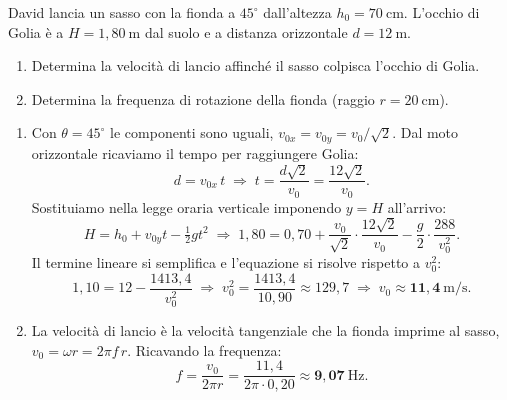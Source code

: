 \begin{question}[ID=1.7, subtitle={David e Golia: velocità e frequenza della fionda}, tags={moto parabolico, moto circolare, traiettoria}, difficulty=difficile]
David lancia un sasso con la fionda a $45^\circ$ dall'altezza $h_0 = 70\ \mathrm{cm}$. L'occhio di Golia è a $H = 1{,}80\ \mathrm{m}$ dal suolo e a distanza orizzontale $d = 12\ \mathrm{m}$.
\begin{enumerate}[parsep=0pt,itemsep=2pt]
    \item Determina la velocità di lancio affinché il sasso colpisca l'occhio di Golia.
    \item Determina la frequenza di rotazione della fionda (raggio $r = 20\ \mathrm{cm}$).
\end{enumerate}
\begin{solution}
\begin{enumerate}
    \item Con $\theta = 45^\circ$ le componenti sono uguali, $v_{0x} = v_{0y} = v_0/\sqrt{2}$. Dal moto orizzontale ricaviamo il tempo per raggiungere Golia:
    \[
    d = v_{0x}\,t \;\Rightarrow\; t = \frac{d\sqrt{2}}{v_0} = \frac{12\sqrt{2}}{v_0}.
    \]
    Sostituiamo nella legge oraria verticale imponendo $y = H$ all'arrivo:
    \[
    H = h_0 + v_{0y}t - \tfrac{1}{2}gt^2 \;\Rightarrow\; 1{,}80 = 0{,}70 + \frac{v_0}{\sqrt{2}}\cdot\frac{12\sqrt{2}}{v_0} - \frac{g}{2}\cdot\frac{288}{v_0^2}.
    \]
    Il termine lineare si semplifica e l'equazione si risolve rispetto a $v_0^2$:
    \[
    1{,}10 = 12 - \frac{1413{,}4}{v_0^2} \;\Rightarrow\; v_0^2 = \frac{1413{,}4}{10{,}90} \approx 129{,}7 \;\Rightarrow\; v_0 \approx \mathbf{11{,}4\ \mathrm{m/s}}.
    \]
    \item La velocità di lancio è la velocità tangenziale che la fionda imprime al sasso, $v_0 = \omega r = 2\pi f\,r$. Ricavando la frequenza:
    \[
    f = \frac{v_0}{2\pi r} = \frac{11{,}4}{2\pi\cdot 0{,}20} \approx \mathbf{9{,}07\ \mathrm{Hz}}.
    \]
\end{enumerate}
\end{solution}
\end{question}
